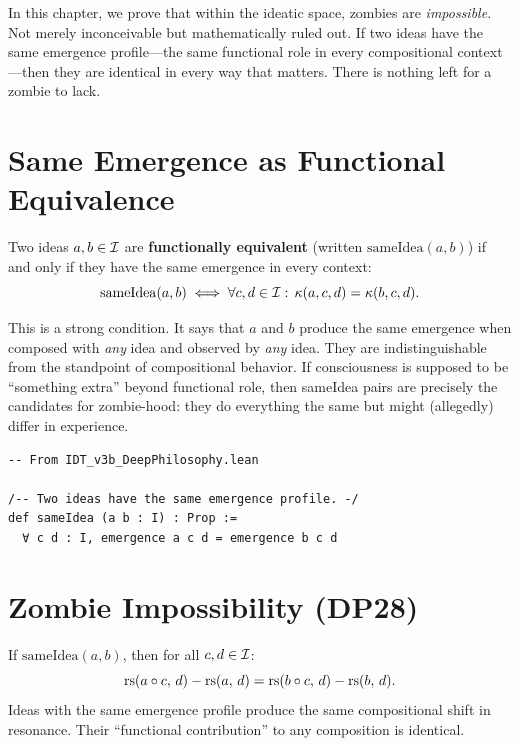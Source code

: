 In this chapter, we prove that within the ideatic space, zombies are
\emph{impossible}.  Not merely inconceivable but mathematically
ruled out.  If two ideas have the same emergence profile---the same
functional role in every compositional context---then they are
identical in every way that matters.  There is nothing left for a
zombie to lack.

\section{Same Emergence as Functional Equivalence}

\begin{definition}
\label{def:same-idea}
Two ideas $a, b \in \mathcal{I}$ are \textbf{functionally equivalent}
(written $\mathrm{sameIdea}(a, b)$) if and only if they have the
same emergence in every context:
\[
\mathrm{sameIdea}(a, b) \iff \forall c, d \in \mathcal{I}:\,
\kappa(a, c, d) = \kappa(b, c, d).
\]
\end{definition}

This is a strong condition.  It says that $a$ and $b$ produce the
same emergence when composed with \emph{any} idea and observed by
\emph{any} idea.  They are indistinguishable from the standpoint of
compositional behavior.  If consciousness is supposed to be
``something extra'' beyond functional role, then sameIdea pairs are
precisely the candidates for zombie-hood: they do everything the
same but might (allegedly) differ in experience.

\begin{lstlisting}
-- From IDT_v3b_DeepPhilosophy.lean

/-- Two ideas have the same emergence profile. -/
def sameIdea (a b : I) : Prop :=
  ∀ c d : I, emergence a c d = emergence b c d
\end{lstlisting}

\section{Zombie Impossibility (DP28)}

\begin{theorem}
\label{thm:zombie-impossibility}
If $\mathrm{sameIdea}(a, b)$, then for all $c, d \in \mathcal{I}$:
\[
\mathrm{rs}(a \circ c,\, d) - \mathrm{rs}(a,\, d) = \mathrm{rs}(b \circ c,\, d) - \mathrm{rs}(b,\, d).
\]
Ideas with the same emergence profile produce the same compositional
shift in resonance.  Their ``functional contribution'' to any composition
is identical.
\end{theorem}

